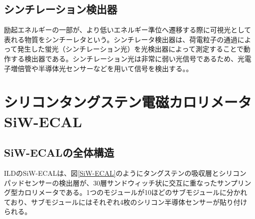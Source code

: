 \subsection{シンチレーション検出器}
 励起エネルギーの一部が、より低いエネルギー準位へ遷移する際に可視光として表れる物質をシンチーレタという。シンチレータ検出器は、荷電粒子の通過によって発生した蛍光（シンチレーション光）を光検出器によって測定することで動作する検出器である。シンチレーション光は非常に弱い光信号であるため、光電子増倍管や半導体光センサーなどを用いて信号を検出する。。
 
\section{シリコンタングステン電磁カロリメータ SiW-ECAL}
\subsection{SiW-ECALの全体構造}
ILDのSiW-ECALは、図\ref{SiW-ECAL}のようにタングステンの吸収層とシリコンパッドセンサーの検出層が、30層サンドウィッチ状に交互に重なったサンプリング型カロリメータである。1つのモジュールが10ほどのサブモジュールに分かれており、サブモジュールにはそれぞれ4枚のシリコン半導体センサーが貼り付けられる。
